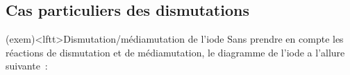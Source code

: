 \documentclass[a4paper, 10pt, landscape, twocolumn]{book}
\begin{document}
\subsection{Cas particuliers des dismutations}

\begin{tcb*}[sidebyside, sidebyside align=top](exem)<lftt>{Dismutation/médiamutation de l'iode}
	Sans prendre en compte les réactions de dismutation et de médiamutation, le
	diagramme de l'iode a l'allure suivante~:
	\begin{center}
\end{center}
\end{tcb*}
\end{document}
